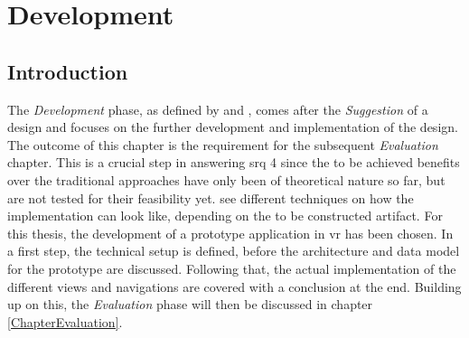 
\chapter{Development}

\label{ChapterDevelopment}




\section{Introduction}

The \textit{Development} phase, as defined by \cite{Vaishnavi2008} and \cite{Hevner2010}, comes after the \textit{Suggestion} of a design and focuses on the further development and implementation of the design. The outcome of this chapter is the requirement for the subsequent \textit{Evaluation} chapter. This is a crucial step in answering \gls{srq} 4 since the to be achieved benefits over the traditional approaches have only been of theoretical nature so far, but are not tested for their feasibility yet. \cite{Vaishnavi2008} see different techniques on how the implementation can look like, depending on the to be constructed artifact. For this thesis, the development of a prototype application in \gls{vr} has been chosen. In a first step, the technical setup is defined, before the architecture and data model for the prototype are discussed. Following that, the actual implementation of the different views and navigations are covered with a conclusion at the end. \newline
Building up on this, the \textit{Evaluation} phase will then be discussed in chapter \ref{ChapterEvaluation}.


